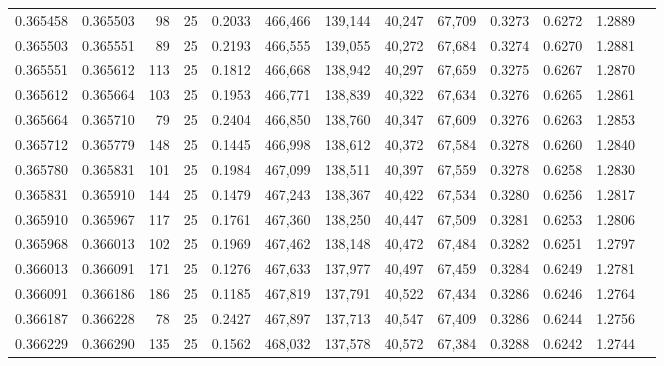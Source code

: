\begin{tabular}{rrrrrrrrrrrrr}
0.365458 & 0.365503 &    98 &  25 &                                     0.2033 & 466,466 & 139,144 &  40,247 &  67,709 & 0.3273 & 0.6272 & 1.2889 \\
0.365503 & 0.365551 &    89 &  25 &                                     0.2193 & 466,555 & 139,055 &  40,272 &  67,684 & 0.3274 & 0.6270 & 1.2881 \\
0.365551 & 0.365612 &   113 &  25 &                                     0.1812 & 466,668 & 138,942 &  40,297 &  67,659 & 0.3275 & 0.6267 & 1.2870 \\
0.365612 & 0.365664 &   103 &  25 &                                     0.1953 & 466,771 & 138,839 &  40,322 &  67,634 & 0.3276 & 0.6265 & 1.2861 \\
0.365664 & 0.365710 &    79 &  25 &                                     0.2404 & 466,850 & 138,760 &  40,347 &  67,609 & 0.3276 & 0.6263 & 1.2853 \\
0.365712 & 0.365779 &   148 &  25 &                                     0.1445 & 466,998 & 138,612 &  40,372 &  67,584 & 0.3278 & 0.6260 & 1.2840 \\
0.365780 & 0.365831 &   101 &  25 &                                     0.1984 & 467,099 & 138,511 &  40,397 &  67,559 & 0.3278 & 0.6258 & 1.2830 \\
0.365831 & 0.365910 &   144 &  25 &                                     0.1479 & 467,243 & 138,367 &  40,422 &  67,534 & 0.3280 & 0.6256 & 1.2817 \\
0.365910 & 0.365967 &   117 &  25 &                                     0.1761 & 467,360 & 138,250 &  40,447 &  67,509 & 0.3281 & 0.6253 & 1.2806 \\
0.365968 & 0.366013 &   102 &  25 &                                     0.1969 & 467,462 & 138,148 &  40,472 &  67,484 & 0.3282 & 0.6251 & 1.2797 \\
0.366013 & 0.366091 &   171 &  25 &                                     0.1276 & 467,633 & 137,977 &  40,497 &  67,459 & 0.3284 & 0.6249 & 1.2781 \\
0.366091 & 0.366186 &   186 &  25 &                                     0.1185 & 467,819 & 137,791 &  40,522 &  67,434 & 0.3286 & 0.6246 & 1.2764 \\
0.366187 & 0.366228 &    78 &  25 &                                     0.2427 & 467,897 & 137,713 &  40,547 &  67,409 & 0.3286 & 0.6244 & 1.2756 \\
0.366229 & 0.366290 &   135 &  25 &                                     0.1562 & 468,032 & 137,578 &  40,572 &  67,384 & 0.3288 & 0.6242 & 1.2744 \\

\end{tabular}
